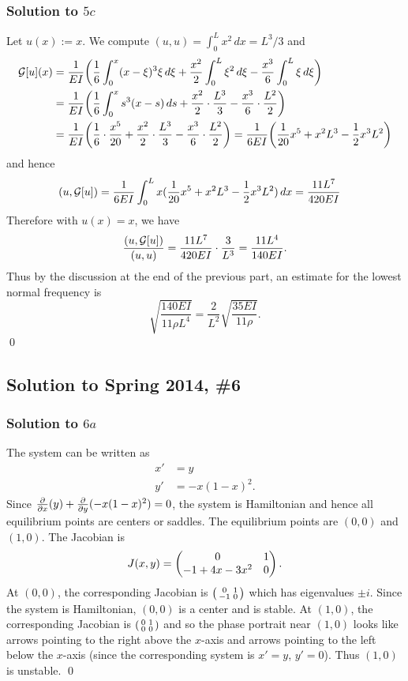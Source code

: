 \subsubsection*{Solution to $5c$}
Let $u(x) := x$. We compute $(u, u) = \int_{0}^{L}x^{2}\, dx = L^{3}/3$ and
\begin{align*}
\mathcal{G}[u](x) &= \frac{1}{EI}\bigg(\frac{1}{6}\int_{0}^{x}(x - \xi)^{3}\xi\, d\xi + \frac{x^{2}}{2}\int_{0}^{L}\xi^{2}\, d\xi - \frac{x^{3}}{6}\int_{0}^{L}\xi\, d\xi\bigg)\\
& = \frac{1}{EI}\bigg(\frac{1}{6}\int_{0}^{x}s^{3}(x- s)\, ds + \frac{x^{2}}{2}\cdot \frac{L^{3}}{3} - \frac{x^{3}}{6}\cdot \frac{L^{2}}{2}\bigg)\\
& = \frac{1}{EI}\bigg(\frac{1}{6}\cdot \frac{x^{5}}{20} + \frac{x^{2}}{2}\cdot \frac{L^{3}}{3} - \frac{x^{3}}{6}\cdot \frac{L^{2}}{2}\bigg) = \frac{1}{6EI}\bigg(\frac{1}{20}x^{5} + x^{2}L^{3} - \frac{1}{2} x^{3}L^{2}\bigg)
\end{align*}
and hence
\begin{align*}
(u, \mathcal{G}[u]) &= \frac{1}{6EI}\int_{0}^{L}x(\frac{1}{20}x^{5} + x^{2}L^{3} - \frac{1}{2} x^{3}L^{2})\, dx = \frac{11L^{7}}{420EI}
\end{align*}
Therefore with $u(x) = x$, we have
\begin{align*}
\frac{(u, \mathcal{G}[u])}{(u, u)} = \frac{11L^{7}}{420EI} \cdot \frac{3}{L^{3}} =\frac{11L^{4}}{140EI}.
\end{align*}
Thus by the discussion at the end of the previous part, an estimate for the lowest normal frequency is
$$\sqrt{\frac{140EI}{11\rho L^{4}}} = \frac{2}{L^{2}}\sqrt{\frac{35EI}{11\rho}}.$$
\hfill\qed

\subsection*{Solution to Spring 2014, \#6}\label{s146}
\subsubsection*{Solution to $6a$}
The system can be written as
\begin{equation}\label{s146aeq1}
\begin{aligned}
x' & = y\\
y' &= -x(1-x)^{2}.
\end{aligned}
\end{equation}
Since $\frac{\partial}{\partial x}(y) + \frac{\partial}{\partial y}(-x(1-x)^{2}) = 0$, the system is Hamiltonian and hence all equilibrium points are centers or saddles.
The equilibrium points are $(0, 0)$ and $(1, 0)$. The Jacobian is
$$J(x, y) = \begin{pmatrix} 0 & 1 \\ -1 + 4x - 3x^{2} & 0\end{pmatrix}.$$
At $(0, 0)$, the corresponding Jacobian is $\left(\begin{smallmatrix} 0 & 1 \\ -1 & 0\end{smallmatrix}\right)$ which has eigenvalues $\pm i$. Since the system is Hamiltonian, $(0, 0)$ is a center and is stable.
At $(1, 0)$, the corresponding Jacobian is $\left(\begin{smallmatrix} 0 & 1 \\ 0 & 0\end{smallmatrix}\right)$ and so the phase portrait near $(1, 0)$ looks like arrows pointing to the right above the $x$-axis
and arrows pointing to the left below the $x$-axis (since the corresponding system is $x' = y$, $y' = 0$). Thus $(1, 0)$ is unstable.
\hfill\qed

